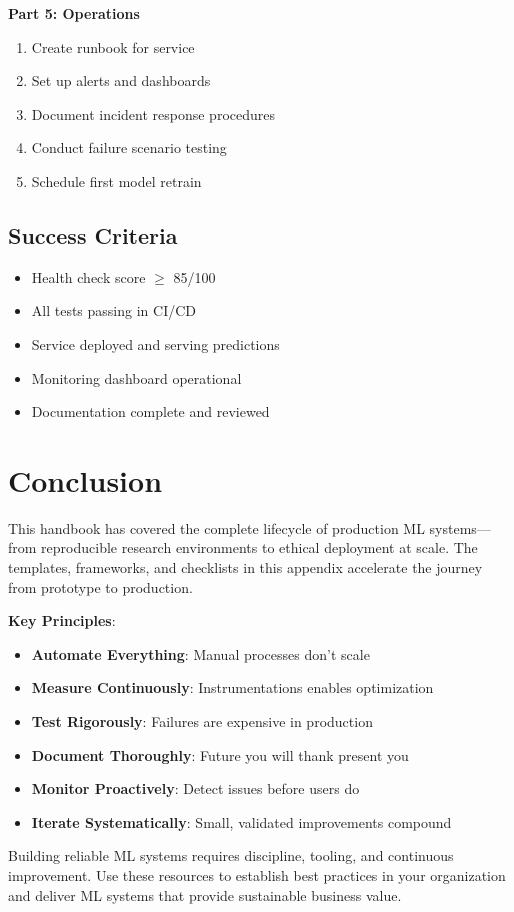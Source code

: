 \textbf{Part 5: Operations}
\begin{enumerate}
    \item Create runbook for service
    \item Set up alerts and dashboards
    \item Document incident response procedures
    \item Conduct failure scenario testing
    \item Schedule first model retrain
\end{enumerate}

\subsection{Success Criteria}

\begin{itemize}
    \item Health check score $\geq$ 85/100
    \item All tests passing in CI/CD
    \item Service deployed and serving predictions
    \item Monitoring dashboard operational
    \item Documentation complete and reviewed
\end{itemize}

\section{Conclusion}

This handbook has covered the complete lifecycle of production ML systems---from reproducible research environments to ethical deployment at scale. The templates, frameworks, and checklists in this appendix accelerate the journey from prototype to production.

\textbf{Key Principles}:
\begin{itemize}
    \item \textbf{Automate Everything}: Manual processes don't scale
    \item \textbf{Measure Continuously}: Instrumentations enables optimization
    \item \textbf{Test Rigorously}: Failures are expensive in production
    \item \textbf{Document Thoroughly}: Future you will thank present you
    \item \textbf{Monitor Proactively}: Detect issues before users do
    \item \textbf{Iterate Systematically}: Small, validated improvements compound
\end{itemize}

Building reliable ML systems requires discipline, tooling, and continuous improvement. Use these resources to establish best practices in your organization and deliver ML systems that provide sustainable business value.
